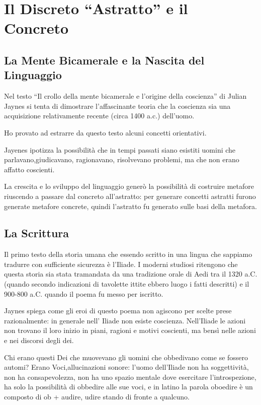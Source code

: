 
\chapter{Il Discreto “Astratto” e il Concreto}
\label{chp:discreto}

\section{La Mente Bicamerale e la Nascita del Linguaggio}

Nel testo “Il crollo della mente bicamerale e l’origine della coscienza” di
Julian Jaynes si tenta di dimostrare l’affascinante teoria che la coscienza sia
una acquisizione relativamente recente (circa 1400 a.c.) dell’uomo.

Ho provato ad estrarre da questo testo alcuni concetti orientativi.

Jayenes ipotizza la possibilità che in tempi passati siano esistiti uomini  che
parlavano,giudicavano, ragionavano, risolvevano problemi, ma che non erano
affatto coscienti.

La crescita e lo sviluppo del linguaggio generò la possibilità di costruire
metafore riuscendo a passare dal concreto all’astratto: per generare concetti
astratti furono generate metafore concrete, quindi l’astratto fu generato sulle
basi della metafora.

\section{La Scrittura}

Il primo testo della storia umana che essendo scritto in una lingua che sappiamo
tradurre con sufficiente sicurezza è l’Iliade. I moderni studiosi ritengono che
questa storia  sia stata tramandata da una tradizione orale di Aedi tra il 1320
a.C.  (quando secondo indicazioni di tavolette ittite ebbero luogo i fatti
descritti) e il 900-800 a.C. quando il poema fu messo per iscritto.

Jaynes spiega come gli eroi di questo poema non agiscono per scelte prese
razionalmente: in generale nell’ Iliade non esiste coscienza. Nell’Iliade  le
azioni non trovano il loro inizio in piani, ragioni e motivi coscienti, ma bensì
nelle azioni e nei discorsi degli  dei.

Chi erano questi Dei che muovevano gli uomini che obbedivano come se fossero
automi? Erano Voci,allucinazioni sonore: l’uomo dell’Iliade non ha soggettività,
non ha consapevolezza, non ha uno spazio mentale dove esercitare l’introspezione,
ha solo la possibilità di obbedire alle sue voci, e in latino la parola oboedire
è un composto di ob + audire, udire stando di fronte a qualcuno.

